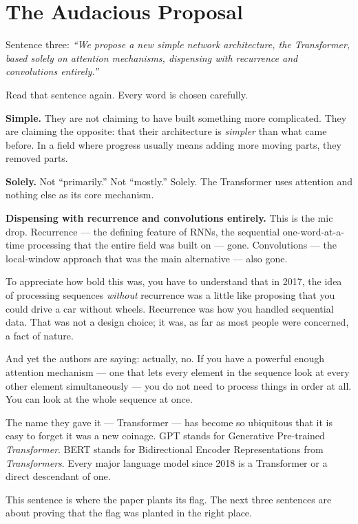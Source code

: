\section{The Audacious Proposal}

Sentence three: \emph{``We propose a new simple network architecture, the Transformer, based solely on attention mechanisms, dispensing with recurrence and convolutions entirely.''}

Read that sentence again.
Every word is chosen carefully.

\textbf{Simple.}
They are not claiming to have built something more complicated.
They are claiming the opposite: that their architecture is \emph{simpler} than what came before.
In a field where progress usually means adding more moving parts, they removed parts.

\textbf{Solely.}
Not ``primarily.''
Not ``mostly.''
Solely.
The Transformer uses attention and nothing else as its core mechanism.

\textbf{Dispensing with recurrence and convolutions entirely.}
This is the mic drop.
Recurrence --- the defining feature of RNNs, the sequential one-word-at-a-time processing that the entire field was built on --- gone.
Convolutions --- the local-window approach that was the main alternative --- also gone.

To appreciate how bold this was, you have to understand that in 2017, the idea of processing sequences \emph{without} recurrence was a little like proposing that you could drive a car without wheels.
Recurrence was how you handled sequential data.
That was not a design choice; it was, as far as most people were concerned, a fact of nature.

And yet the authors are saying: actually, no.
If you have a powerful enough attention mechanism --- one that lets every element in the sequence look at every other element simultaneously --- you do not need to process things in order at all.
You can look at the whole sequence at once.

The name they gave it --- Transformer --- has become so ubiquitous that it is easy to forget it was a new coinage.
GPT stands for Generative Pre-trained \emph{Transformer}.
BERT stands for Bidirectional Encoder Representations from \emph{Transformers}.
Every major language model since 2018 is a Transformer or a direct descendant of one.

This sentence is where the paper plants its flag.
The next three sentences are about proving that the flag was planted in the right place.
